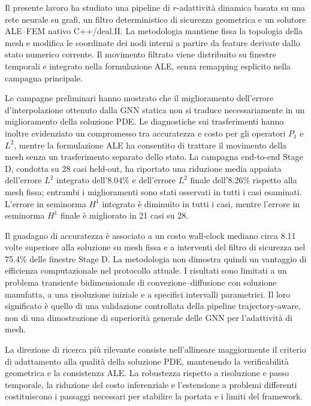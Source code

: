 Il presente lavoro ha studiato una pipeline di $r$-adattività dinamica basata su una rete neurale su grafi, un filtro deterministico di sicurezza geometrica e un solutore ALE--FEM nativo C++/deal.II. La metodologia mantiene fissa la topologia della mesh e modifica le coordinate dei nodi interni a partire da feature derivate dallo stato numerico corrente. Il movimento filtrato viene distribuito su finestre temporali e integrato nella formulazione ALE, senza remapping esplicito nella campagna principale.

Le campagne preliminari hanno mostrato che il miglioramento dell'errore d'interpolazione ottenuto dalla GNN statica non si traduce necessariamente in un miglioramento della soluzione PDE. Le diagnostiche sui trasferimenti hanno inoltre evidenziato un compromesso tra accuratezza e costo per gli operatori $P_1$ e $L^2$, mentre la formulazione ALE ha consentito di trattare il movimento della mesh senza un trasferimento separato dello stato. La campagna end-to-end Stage D, condotta su 28 casi held-out, ha riportato una riduzione media appaiata dell'errore $L^2$ integrato dell'8.04\% e dell'errore $L^2$ finale dell'8.26\% rispetto alla mesh fissa; entrambi i miglioramenti sono stati osservati in tutti i casi esaminati. L'errore in seminorma $H^1$ integrato è diminuito in tutti i casi, mentre l'errore in seminorma $H^1$ finale è migliorato in 21 casi su 28.

Il guadagno di accuratezza è associato a un costo wall-clock mediano circa 8.11 volte superiore alla soluzione su mesh fissa e a interventi del filtro di sicurezza nel 75.4\% delle finestre Stage D. La metodologia non dimostra quindi un vantaggio di efficienza computazionale nel protocollo attuale. I risultati sono limitati a un problema transiente bidimensionale di convezione--diffusione con soluzione manufatta, a una risoluzione iniziale e a specifici intervalli parametrici. Il loro significato è quello di una validazione controllata della pipeline trajectory-aware, non di una dimostrazione di superiorità generale delle GNN per l'adattività di mesh.

La direzione di ricerca più rilevante consiste nell'allineare maggiormente il criterio di adattamento alla qualità della soluzione PDE, mantenendo la verificabilità geometrica e la consistenza ALE. La robustezza rispetto a risoluzione e passo temporale, la riduzione del costo inferenziale e l'estensione a problemi differenti costituiscono i passaggi necessari per stabilire la portata e i limiti del framework.
